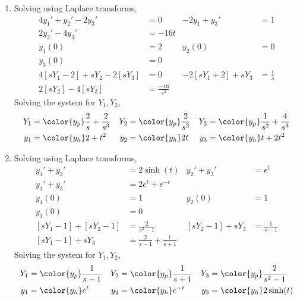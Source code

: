 \begin{enumerate}
    \item Solving using Laplace transforms,
          \begin{align}
              4y_1' + y_2' - 2y_3'         & = 0               &
              -2y_1 + y_3'                 & = 1                 \\
              2y_2' - 4y_3'                & = -16t              \\
              y_1(0)                       & = 2               &
              y_2(0)                       & = 0                 \\
              y_3(0)                       & = 0                 \\
              4[sY_1 - 2] + sY_2 - 2[sY_3] & = 0               &
              -2[sY_1 + 2] + sY_3          & = \frac{1}{s}       \\
              2[sY_2] - 4[sY_3]            & = \frac{-16}{s^2}
          \end{align}
          Solving the system for $ Y_1, Y_2 $,
          \begin{align}
              Y_1 & = \color{y_p} \frac{2}{s} + \frac{2}{s^3}   &
              Y_2 & = \color{y_p} \frac{2}{s^2}                 &
              Y_3 & = \color{y_p} \frac{1}{s^2} + \frac{4}{s^3}   \\
              y_1 & = \color{y_h} 2 + t^2                       &
              y_2 & = \color{y_h} 2t                            &
              y_3 & = \color{y_h} t + 2t^2
          \end{align}

    \item Solving using Laplace transforms,
          \begin{align}
              y_1' + y_2'             & = 2\sinh(t)                     &
              y_2' + y_3'             & = e^t                             \\
              y_1' + y_3'             & = 2e^t + e^{-t}                   \\
              y_1(0)                  & = 1                             &
              y_2(0)                  & = 1                               \\
              y_3(0)                  & = 0                               \\
              [sY_1 - 1] + [sY_2 - 1] & = \frac{2}{s^2 - 1}             &
              [sY_2 - 1] + sY_3       & = \frac{1}{s-1}                   \\
              [sY_1 - 1] + sY_3       & = \frac{2}{s-1} + \frac{1}{s+1}
          \end{align}
          Solving the system for $ Y_1, Y_2 $,
          \begin{align}
              Y_1 & = \color{y_p} \frac{1}{s-1}     &
              Y_2 & = \color{y_p} \frac{1}{s+1}     &
              Y_3 & = \color{y_p} \frac{2}{s^2 - 1}   \\
              y_1 & = \color{y_h} e^t               &
              y_2 & = \color{y_h} e^{-t}            &
              y_3 & = \color{y_h} 2\sinh(t)
          \end{align}


\end{enumerate}
